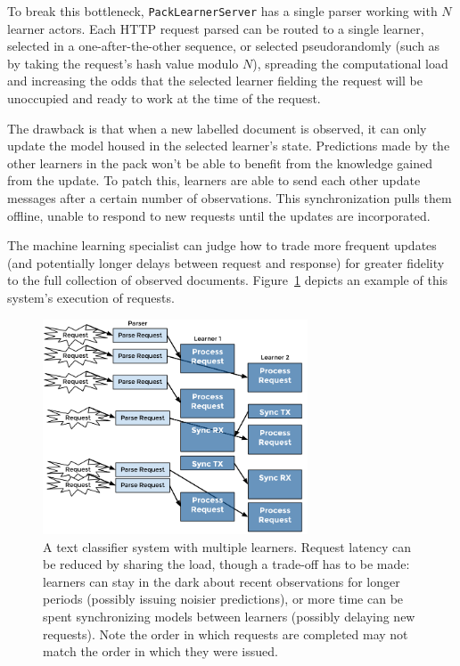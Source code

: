 \documentclass[tablecaption=bottom,wcp]{jmlr}
\begin{document}
To break this bottleneck, \texttt{PackLearnerServer} has a single parser working
with $N$ learner actors. Each HTTP request parsed can be routed to a single learner,
selected in a one-after-the-other sequence, or selected pseudorandomly (such as by 
taking the request's hash value modulo $N$), spreading the computational load and
increasing the odds that the selected learner fielding the request will be unoccupied and
ready to work at the time of the request. 

The drawback is that when a new labelled document is observed, it can only update
the model housed in the selected learner's state. Predictions made by the other
learners in the pack won't be able to benefit from the knowledge gained from the 
update. To patch this, learners are able to send each other update messages
after a certain number of observations. This synchronization pulls them offline, unable
to respond to new requests until the updates are incorporated. 

The machine learning specialist can judge how to trade more frequent updates (and 
potentially longer delays between request and response) for greater fidelity to the full 
collection of observed documents. Figure~\ref{fig_txt_cls_dbl} depicts an example of 
this system's execution of requests.

\begin{figure}[h]
\includegraphics[width=0.7\textwidth]{fig/tex/double_txt_cls.png}
\centering
\caption{A text classifier system with multiple learners. Request latency can be reduced
by sharing the load, though a trade-off has to be made: learners can stay in the dark 
about recent observations for longer periods (possibly issuing noisier predictions), or 
more time can be spent synchronizing models between learners (possibly delaying 
new requests). Note the order in which requests are completed may not match the 
order in which they were issued.}
\label{fig_txt_cls_dbl}
\end{figure}
\end{document}
